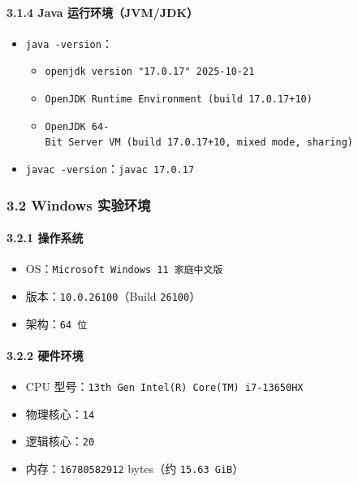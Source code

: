\documentclass[12pt,fontset=none]{ctexart}
\providecommand{\tightlist}{%
  \setlength{\itemsep}{0pt}\setlength{\parskip}{0pt}}
\begin{document}
\paragraph{3.1.4 Java
运行环境（JVM/JDK）}\label{314-java-ux8fd0ux884cux73afux5883jvmjdk}

\begin{itemize}
\tightlist
\item
  \texttt{java\ -version}：

  \begin{itemize}
  \tightlist
  \item
    \texttt{openjdk\ version\ "17.0.17"\ 2025-10-21}
  \item
    \texttt{OpenJDK\ Runtime\ Environment\ (build\ 17.0.17+10)}
  \item
    \texttt{OpenJDK\ 64-Bit\ Server\ VM\ (build\ 17.0.17+10,\ mixed\ mode,\ sharing)}
  \end{itemize}
\item
  \texttt{javac\ -version}：\texttt{javac\ 17.0.17}
\end{itemize}

\subsubsection{3.2 Windows
实验环境}\label{32-windows-ux5b9eux9a8cux73afux5883}

\paragraph{3.2.1 操作系统}\label{321-ux64cdux4f5cux7cfbux7edf}

\begin{itemize}
\tightlist
\item
  OS：\texttt{Microsoft\ Windows\ 11\ 家庭中文版}
\item
  版本：\texttt{10.0.26100}（Build \texttt{26100}）
\item
  架构：\texttt{64\ 位}
\end{itemize}

\paragraph{3.2.2 硬件环境}\label{322-ux786cux4ef6ux73afux5883}

\begin{itemize}
\tightlist
\item
  CPU 型号：\texttt{13th\ Gen\ Intel(R)\ Core(TM)\ i7-13650HX}
\item
  物理核心：\texttt{14}
\item
  逻辑核心：\texttt{20}
\item
  内存：\texttt{16780582912} bytes（约 \texttt{15.63\ GiB}）
\end{itemize}
\end{document}
